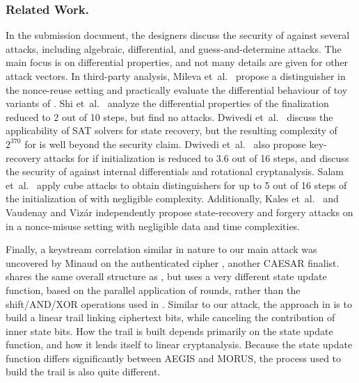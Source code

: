 \subsubsection*{Related Work.}
In the \MORUS submission document, the designers discuss the security of \MORUS against
several attacks, including algebraic, differential, and guess-and-determine attacks.
The main focus is on differential properties, and not many details are given for other attack vectors.
In third-party analysis,
Mileva et~al.~\cite{balkancryptsecMilevaDV15} propose a distinguisher in the nonce-reuse setting and practically evaluate the differential behaviour of toy variants of \MORUS.
Shi et~al.~\cite{aiieShiGLZ16} analyze the differential properties of the finalization reduced to 2 out of 10 steps, but find no attacks.
Dwivedi et~al.~\cite{cryptoeprint:2016:1053} discuss the applicability of SAT solvers for state recovery, but the resulting complexity of $2^{370}$ for \MORUS[640] is well beyond the security claim.
Dwivedi et~al.~\cite{secryptDwivediMW17} also propose key-recovery attacks for \MORUS[1280] if initialization is reduced to 3.6 out of 16 steps, and discuss the security of \MORUS against internal differentials and rotational cryptanalysis.
Salam et~al.~\cite{trustcomSalamSBDPW17} apply cube attacks to obtain distinguishers for up to 5 out of 16 steps of the initialization of \MORUS[1280] with negligible complexity.
Additionally, 
Kales et~al.~\cite{cryptoeprint:2017:1137} and
Vaudenay and Viz\'{a}r \cite{cryptoeprint:2017:1147}
independently propose state-recovery and forgery attacks on \MORUS in a nonce-misuse setting with negligible data and time complexities.

Finally, a keystream correlation similar in nature to our main attack was uncovered by Minaud \cite{sacryptMinaud14} on the authenticated cipher  \cite{AEGIS,sacryptWuP13}, another CAESAR finalist.
 shares the same overall structure as \MORUS, but uses a very different state update function,
based on the parallel application of  rounds, rather than the shift/AND/XOR operations used in \MORUS.
Similar to our attack, the approach in \cite{sacryptMinaud14} is to build a linear trail linking ciphertext bits, while canceling the
contribution of inner state bits.
How the trail is built depends primarily on the state update function, and how it lends itself to linear cryptanalysis.
Because the state update function differs significantly between AEGIS and MORUS, the process used to build the trail is also quite different.

